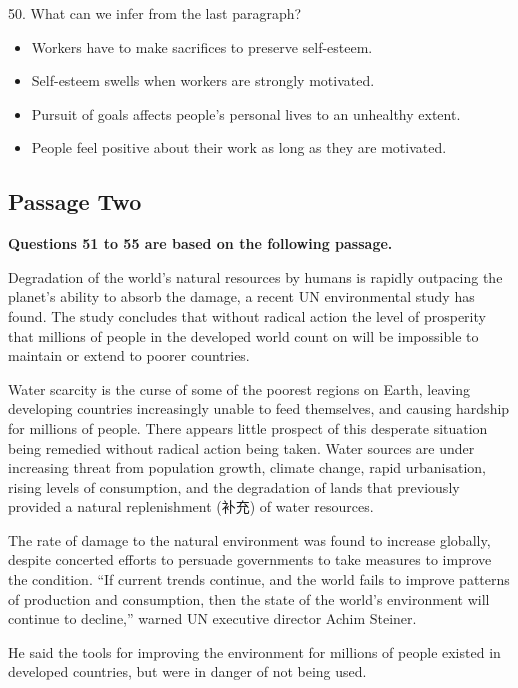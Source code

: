 \documentclass[UTF8,11pt]{ctexart}
\begin{document}
50. What can we infer from the last paragraph?


\begin{itemize}[leftmargin=2em,itemsep=.2em,topsep=.4em]\item[A.] Workers have to make sacrifices to preserve self-esteem.
\item[B.] Self-esteem swells when workers are strongly motivated.
\item[C.] Pursuit of goals affects people’s personal lives to an unhealthy extent.
\item[D.] People feel positive about their work as long as they are motivated.
\end{itemize}

\subsection*{\textbf{Passage Two}}


\textbf{Questions 51 to 55 are based on the following passage.}


Degradation of the world’s natural resources by humans is rapidly outpacing the planet’s ability to absorb the damage, a recent UN environmental study has found. The study concludes that without radical action the level of prosperity that millions of people in the developed world count on will be impossible to maintain or extend to poorer countries.


Water scarcity is the curse of some of the poorest regions on Earth, leaving developing countries increasingly unable to feed themselves, and causing hardship for millions of people. There appears little prospect of this desperate situation being remedied without radical action being taken. Water sources are under increasing threat from population growth, climate change, rapid urbanisation, rising levels of consumption, and the degradation of lands that previously provided a natural replenishment (补充) of water resources.


The rate of damage to the natural environment was found to increase globally, despite concerted efforts to persuade governments to take measures to improve the condition. “If current trends continue, and the world fails to improve patterns of production and consumption, then the state of the world’s environment will continue to decline,” warned UN executive director Achim Steiner.


He said the tools for improving the environment for millions of people existed in developed countries, but were in danger of not being used.
\end{document}
